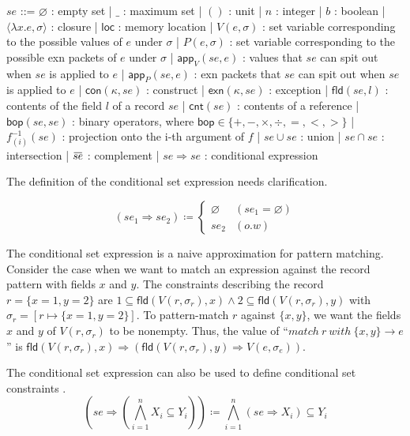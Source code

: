 \documentclass{article}
\newcommand{\loverbar}[1]{\mkern 1.5mu\overline{\mkern-1.5mu#1\mkern-1.5mu}\mkern 1.5mu}
\begin{document}
\begin{bnfgrammar}
  $se$ ::= $\varnothing$ : empty set
  | $\_$ : maximum set
  | $()$ : unit
  | $n$ : integer
  | $b$ : boolean
  | $\langle\lambda x.e,\sigma\rangle$ : closure
  | $\mathsf{loc}$ : memory location
  | $V(e,\sigma)$ : set variable corresponding to the possible values of $e$ under $\sigma$
  | $P(e,\sigma)$ : set variable corresponding to the possible exn packets of $e$ under $\sigma$
  | $\mathsf{app}_{V}(se,e)$ : values that $se$ can spit out when $se$ is applied to $e$
  | $\mathsf{app}_{P}(se,e)$ : exn packets that $se$ can spit out when $se$ is applied to $e$
  | $\mathsf{con}(\kappa,se)$ : construct
  | $\mathsf{exn}(\kappa,se)$ : exception
  | $\mathsf{fld}(se, l)$ : contents of the field $l$ of a record $se$
  | $\mathsf{cnt}(se)$ : contents of a reference
  | $\mathsf{bop}(se, se)$ : binary operators, where $\mathsf{bop}\in\{+, -, \times, \div, =, <, >\}$
  | $f^{-1}_{(i)}(se)$ : projection onto the i-th argument of $f$
  | $se \cup se$ : union
  | $se \cap se$ : intersection
  | $\loverbar{se}$ : complement
  | $se \Rightarrow se$ : conditional expression
\end{bnfgrammar}

The definition of the conditional set expression needs clarification.

\[
  (se_{1} \Rightarrow se_{2}) \coloneq
  \begin{cases}
    \varnothing & (se_{1}=\varnothing)\\
    se_{2} & (o.w)
  \end{cases}
\]

The conditional set expression is a naive approximation for pattern matching. Consider the case when we want to match an expression against the record pattern with fields $x$ and $y$.
The constraints describing the record $r = \{x = 1, y = 2\}$ are $1 \subseteq \mathsf{fld}(V(r,\sigma_{r}), x) \wedge 2 \subseteq \mathsf{fld}(V(r,\sigma_{r}), y)$ with $\sigma_{r}=[r\mapsto\{x=1, y=2\}]$.
To pattern-match $r$ against $\{x, y\}$, we want the fields $x$ and $y$ of $V(r,\sigma_{r})$ to be nonempty.
Thus, the value of ``$match\:r\:with\:\{x, y\}\rightarrow e$'' is $\mathsf{fld}(V(r,\sigma_{r}), x)\Rightarrow(\mathsf{fld}(V(r,\sigma_{r}),y)\Rightarrow V(e,\sigma_{e}))$.

The conditional set expression can also be used to define conditional set constraints \cite{Aik99}.
\[
  \left(se \Rightarrow \left(\bigwedge_{i=1}^{n}{X_{i}\subseteq Y_{i}}\right)\right) \coloneq \bigwedge_{i=1}^{n}{(se \Rightarrow X_{i}) \subseteq Y_{i}}
\]
\end{document}

